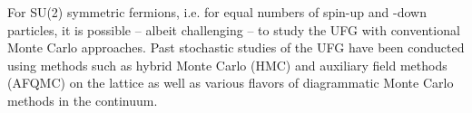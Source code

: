 \documentclass[../main.tex]{subfiles}
\begin{document}
For SU(2) symmetric fermions, i.e. for equal numbers of spin-up and -down particles, it is possible -- albeit challenging -- to study the UFG with conventional Monte Carlo approaches. Past stochastic studies of
the UFG have been conducted using methods such as hybrid Monte Carlo (HMC) \cite{PhysRevA.85.051601, PhysRevLett.110.090401, PhysRevA.93.053604} and auxiliary field methods (AFQMC) on the
lattice \cite{Jensen2019, PhysRevA.84.061602, PhysRevB.73.115112} as well as various flavors of diagrammatic Monte Carlo methods \cite{PhysRevLett.121.130405, VanHoucke2012} in the continuum.

\end{document}
